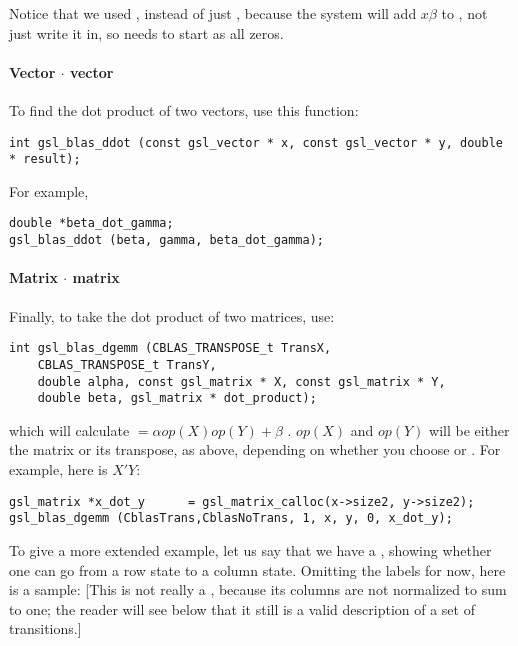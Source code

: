 Notice that we used , instead of just , because
the system will add $x\beta$ to , not just write it in,
so  needs to start as all zeros.

\paragraph{Vector $\cdot$ vector}
To find the dot product of two vectors, use this function:
\begin{lstlisting}
int gsl_blas_ddot (const gsl_vector * x, const gsl_vector * y, double * result);
\end{lstlisting}

For example, \label{ddot}

\begin{lstlisting}
double *beta_dot_gamma;
gsl_blas_ddot (beta, gamma, beta_dot_gamma);
\end{lstlisting}

\paragraph{Matrix $\cdot$ matrix}
Finally, to take the dot product of two matrices, use:
\begin{lstlisting}
int gsl_blas_dgemm (CBLAS_TRANSPOSE_t TransX, 
    CBLAS_TRANSPOSE_t TransY, 
    double alpha, const gsl_matrix * X, const gsl_matrix * Y, 
    double beta, gsl_matrix * dot_product);
\end{lstlisting}
which will calculate  $= \alpha op(X) op(Y) + \beta$ . $op(X)$ and
$op(Y)$ will be either the matrix or its transpose, as above, depending on whether you choose 
or . For example, here is $X'Y$:

\begin{lstlisting}
gsl_matrix *x_dot_y      = gsl_matrix_calloc(x->size2, y->size2);
gsl_blas_dgemm (CblasTrans,CblasNoTrans, 1, x, y, 0, x_dot_y);
\end{lstlisting}

To give a more extended example, let us say that we have a , showing whether one can go from a row state to a
column state. Omitting the labels for now, here is a sample:
\label{twostep} 
[This is not really a , because its
columns are not normalized to sum to one; the reader will see below that it
still is a valid description of a set of transitions.]

